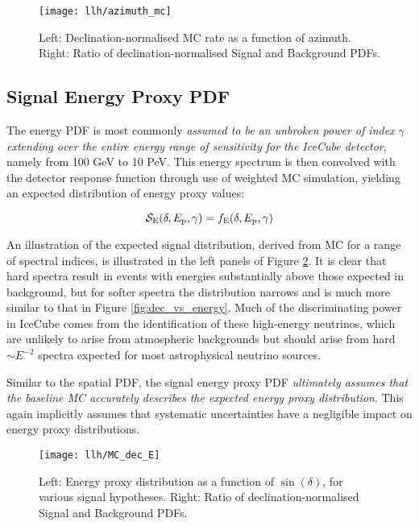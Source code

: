 \begin{figure}[!ht]
	\centering \texttt{[image: llh/azimuth\_mc]}
	\caption{Left: Declination-normalised MC rate as a function of azimuth. Right: Ratio of declination-normalised Signal and Background PDFs.}
	\label{fig:azimuth_mc}
\end{figure}

\subsection*{Signal Energy Proxy PDF}

The energy PDF is most commonly \emph{assumed to be an unbroken power of index $\gamma$ extending over the entire energy range of sensitivity for the IceCube detector}, namely from 100 GeV to 10 PeV. This energy spectrum is then convolved with the detector response function through use of weighted MC simulation, yielding an expected distribution of energy proxy values:

\begin{equation}
\mathcal{S}_{\textup{E}} (\delta, E_{\textup{p}}, \gamma) = f_{\textup{E}}(\delta, E_{\textup{p}}, \gamma)
\label{eq:s_energy}
\end{equation}

An illustration of the expected signal distribution, derived from MC for a range of spectral indices, is illustrated in the left panels of Figure \ref{fig:mc_dec_e}. It is clear that hard spectra result in events with energies substantially above those expected in background, but for softer spectra the distribution narrows and is much more similar to that in Figure \ref{fig:dec_vs_energy}. Much of the discriminating power in IceCube comes from the identification of these high-energy neutrinos, which are unlikely to arise from atmospheric backgrounds but should arise from hard $\sim E^{-2}$ spectra expected for most astrophysical neutrino sources. 

Similar to the spatial PDF, the signal energy proxy PDF \emph{ultimately assumes that the baseline MC accurately describes the expected energy proxy distribution}. This again implicitly assumes that systematic uncertainties have a negligible impact on energy proxy distributions. 

\begin{figure}[!ht]
	\centering \texttt{[image: llh/MC\_dec\_E]}
	\caption{Left: Energy proxy distribution as a function of $\sin(\delta)$, for various signal hypotheses. Right: Ratio of declination-normalised Signal and Background PDFs.}
	\label{fig:mc_dec_e}
\end{figure}

